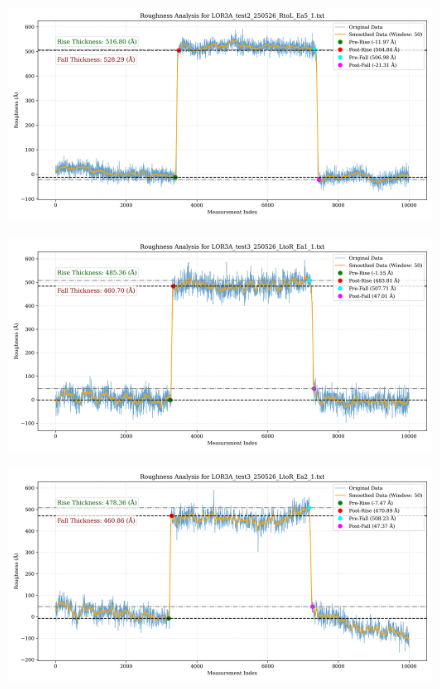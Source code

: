 \documentclass[platex,dvipdfmx,10pt,twoside,a4paper,jis2004]{jsarticle}
\begin{document}
\begin{figure}[H]
    \centering
    \includegraphics[width=\textwidth]{LOR3A_test2_250526_RtoL_Ea5_1.png}
    \label{fig:LOR3Atest2250526RtoLEa51}
\end{figure}
\begin{figure}[H]
    \centering
    \includegraphics[width=\textwidth]{LOR3A_test3_250526_LtoR_Ea1_1.png}
    \label{fig:LOR3Atest3250526LtoREa11}
\end{figure}
\begin{figure}[H]
    \centering
    \includegraphics[width=\textwidth]{LOR3A_test3_250526_LtoR_Ea2_1.png}
    \label{fig:LOR3Atest3250526LtoREa21}
\end{figure}
\end{document}
